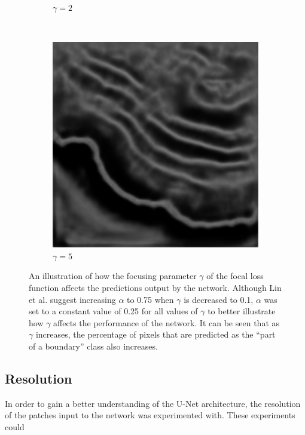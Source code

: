 \begin{figure}[t]
\begin{subfigure}[t]{0.32\textwidth}
        \caption{$\gamma=2$}
    \end{subfigure}
    ~
    \begin{subfigure}[t]{0.32\textwidth}
        \centering
        \includegraphics[width=1\textwidth, valign=c]{images/focal_g5.png}
        \caption{$\gamma=5$}
    \end{subfigure}
    \caption{An illustration of how the focusing parameter $\gamma$ of the focal loss function affects the predictions output by the network. Although Lin et al. suggest increasing $\alpha$ to 0.75 when $\gamma$ is decreased to 0.1, $\alpha$ was set to a constant value of 0.25 for all values of $\gamma$ to better illustrate how $\gamma$ affects the performance of the network. It can be seen that as $\gamma$ increases, the percentage of pixels that are predicted as the ``part of a boundary'' class also increases.}
    \label{fig:lossfunctiondiff}
\end{figure}

\subsection{Resolution}

In order to gain a better understanding of the U-Net architecture, the resolution of the patches input to the network was experimented with. These experiments could 

